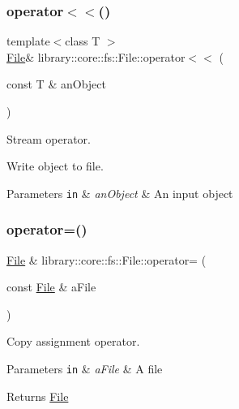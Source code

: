 \subsubsection{\texorpdfstring{operator$<$$<$()}{operator<<()}}
{\footnotesize\ttfamily template$<$class T $>$ \\
\hyperlink{classlibrary_1_1core_1_1fs_1_1_file}{File}\& library\+::core\+::fs\+::\+File\+::operator$<$$<$ (\begin{DoxyParamCaption}\item[{const T \&}]{an\+Object }\end{DoxyParamCaption})\hspace{0.3cm}{\ttfamily [inline]}}



Stream operator. 

Write object to file.


\begin{DoxyParams}[1]{Parameters}
\mbox{\tt in}  & {\em an\+Object} & An input object \\
\hline
\end{DoxyParams}
\mbox{\label{classlibrary_1_1core_1_1fs_1_1_file_a8143d55e67cf2d6256c7653619a03909}} 
\subsubsection{\texorpdfstring{operator=()}{operator=()}}
{\footnotesize\ttfamily \hyperlink{classlibrary_1_1core_1_1fs_1_1_file}{File} \& library\+::core\+::fs\+::\+File\+::operator= (\begin{DoxyParamCaption}\item[{const \hyperlink{classlibrary_1_1core_1_1fs_1_1_file}{File} \&}]{a\+File }\end{DoxyParamCaption})}



Copy assignment operator. 


\begin{DoxyParams}[1]{Parameters}
\mbox{\tt in}  & {\em a\+File} & A file \\
\hline
\end{DoxyParams}
\begin{DoxyReturn}{Returns}
\hyperlink{classlibrary_1_1core_1_1fs_1_1_file}{File} 
\end{DoxyReturn}
\mbox{\label{classlibrary_1_1core_1_1fs_1_1_file_a44ab79a23c5a129be298a026dbeec62f}} 
